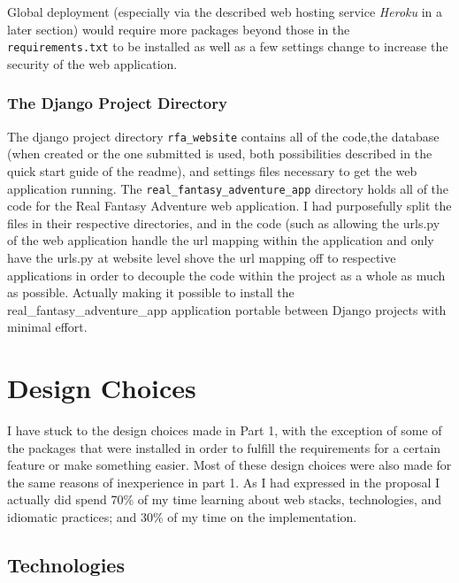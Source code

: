 \documentclass[11pt,a4paper]{article}
\begin{document}
Global deployment (especially via the described web hosting service \textit{Heroku} in a later section) would require more packages beyond those in the \verb|requirements.txt| to be installed as well as a few settings change to increase the security of the web application.

\subsubsection{The Django Project Directory}
The django project directory \verb|rfa_website| contains all of the code,the database (when created or the one submitted is used, both possibilities described in the quick start guide of the readme), and settings files necessary to get the web application running. The \verb|real_fantasy_adventure_app| directory holds all of the code for the Real Fantasy Adventure web application. I had purposefully split the files in their respective directories, and in the code (such as allowing the urls.py of the web application handle the url mapping within the application and only have the urls.py at website level shove the url mapping off to respective applications in order to decouple the code within the project as a whole as much as possible. Actually making it possible to install the real\_fantasy\_adventure\_app application portable between Django projects with minimal effort.


\section{Design Choices}
I have stuck to the design choices made in Part 1, with the exception of some of the packages that were installed in order to fulfill the requirements for a certain feature or make something easier. Most of these design choices were also made for the same reasons of inexperience in part 1. As I had expressed in the proposal I actually did spend 70\% of my time learning about web stacks, technologies, and idiomatic practices; and 30\% of my time on the implementation.

\subsection{Technologies}
\end{document}
